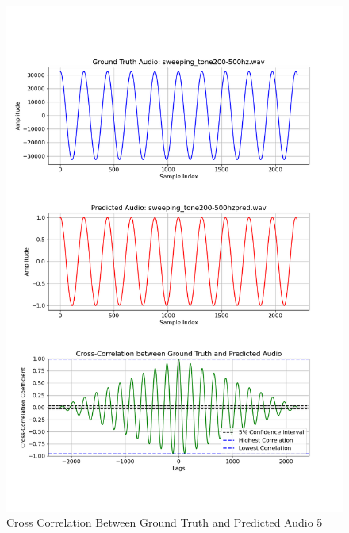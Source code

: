 \documentclass{ioereport}
\begin{document}
    \begin{figure}[H]
        \centering
        \includegraphics[width=\linewidth]{assets/crosscorrelation/cross_correlation_sweeping_tone200-500hz.wav_sweeping_tone200-500hzpred.wav.png}
        \caption{Cross Correlation Between Ground Truth and Predicted Audio 5}
        \label{fig:cross-correlation-5}
    \end{figure}
\end{document}
